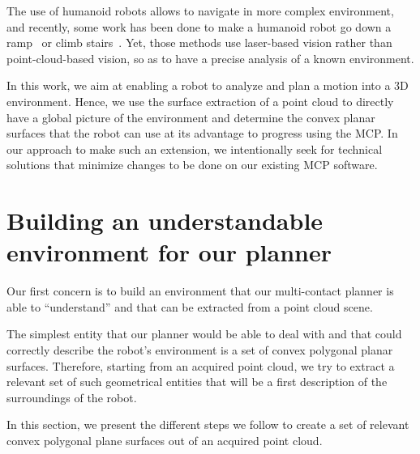 The use of humanoid robots allows to navigate in more complex environment, and recently, some work has been done to make a humanoid robot go down a ramp~\cite{lutz:iros:2012} or climb stairs~\cite{osswald:iros:2012}. Yet, those methods use laser-based vision rather than point-cloud-based vision, so as to have a precise analysis of a known environment.

In this work, we aim at enabling a robot to analyze and plan a motion into a 3D environment. Hence, we use the surface extraction of a point cloud to directly have a global picture of the environment and determine the convex planar surfaces that the robot can use at its advantage to progress using the MCP. In our approach to make such an extension, we intentionally seek for technical solutions that minimize changes to be done on our existing MCP software.

\section{Building an understandable environment for our planner}

Our first concern is to build an environment that our multi-contact planner is able to ``understand'' and that can be extracted from a point cloud scene. 

The simplest entity that our planner would be able to deal with and that could correctly describe the robot's environment is a set of convex polygonal planar surfaces. Therefore, starting from an acquired point cloud, we try to extract a relevant set of such geometrical entities that will be a first description of the surroundings of the robot.

In this section, we present the different steps we follow to create a set of relevant convex polygonal plane surfaces out of an acquired point cloud.

